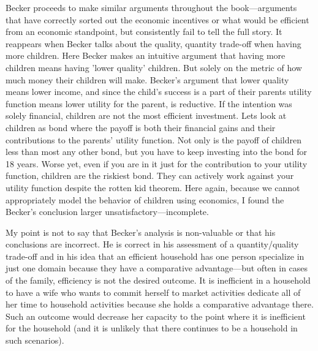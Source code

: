 \documentclass{article}
\begin{document}
Becker proceeds to make similar arguments throughout the book—arguments that have correctly sorted out the economic incentives or what would be efficient from an economic standpoint, but consistently fail to tell the full story. It reappears when Becker talks about the quality, quantity trade-off when having more children. Here Becker makes an intuitive argument that having more children means having 'lower quality' children. But solely on the metric of how much money their children will make. Becker's argument that lower quality means lower income, and since the child's success is a part of their parents utility function means lower utility for the parent, is reductive. If the intention was solely financial, children are not the most efficient investment. Lets look at children as bond where the payoff is both their financial gains and their contributions to the parents' utility function. Not only is the payoff of children less than most any other bond, but you have to keep investing into the bond for 18 years. Worse yet, even if you are in it just for the contribution to your utility function, children are the riskiest bond. They can actively work against your utility function despite the rotten kid theorem. Here again, because we cannot appropriately model the behavior of children using economics, I found the Becker's conclusion larger unsatisfactory—incomplete.

My point is not to say that Becker's analysis is non-valuable or that his conclusions are incorrect. He is correct in his assessment of a quantity/quality trade-off and in his idea that an efficient household has one person specialize in just one domain because they have a comparative advantage—but often in cases of the family, efficiency is not the desired outcome. It is inefficient in a household to have a wife who wants to commit herself to market activities dedicate all of her time to household activities because she holds a comparative advantage there. Such an outcome would decrease her capacity to the point where it is inefficient for the household (and it is unlikely that there continues to be a household in such scenarios).
\end{document}
